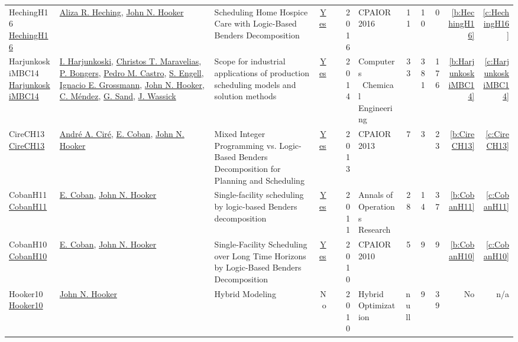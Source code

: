 {\begin{longtable}{>{\raggedright\arraybackslash}p{3cm}>{\raggedright\arraybackslash}p{6cm}>{\raggedright\arraybackslash}p{6.5cm}rrrp{2.5cm}rrrrr}
HechingH16 \href{https://doi.org/10.1007/978-3-319-33954-2\_14}{HechingH16} & \hyperref[auth:a323]{Aliza R. Heching}, \hyperref[auth:a162]{John N. Hooker} & Scheduling Home Hospice Care with Logic-Based Benders Decomposition & \href{works/HechingH16.pdf}{Yes} & \cite{HechingH16} & 2016 & CPAIOR 2016 & 11 & 10 & 0 & \ref{b:HechingH16} & \ref{c:HechingH16}\\
HarjunkoskiMBC14 \href{http://dx.doi.org/10.1016/j.compchemeng.2013.12.001}{HarjunkoskiMBC14} & \hyperref[auth:a884]{I. Harjunkoski}, \hyperref[auth:a387]{Christos T. Maravelias}, \hyperref[auth:a959]{P. Bongers}, \hyperref[auth:a907]{Pedro M. Castro}, \hyperref[auth:a70]{S. Engell}, \hyperref[auth:a388]{Ignacio E. Grossmann}, \hyperref[auth:a162]{John N. Hooker}, \hyperref[auth:a960]{C. Méndez}, \hyperref[auth:a961]{G. Sand}, \hyperref[auth:a962]{J. Wassick} & Scope for industrial applications of production scheduling models and solution methods & \href{works/HarjunkoskiMBC14.pdf}{Yes} & \cite{HarjunkoskiMBC14} & 2014 & Computers \  Chemical Engineering & 33 & 381 & 176 & \ref{b:HarjunkoskiMBC14} & \ref{c:HarjunkoskiMBC14}\\
CireCH13 \href{https://doi.org/10.1007/978-3-642-38171-3\_22}{CireCH13} & \hyperref[auth:a159]{Andr{\'{e}} A. Cir{\'{e}}}, \hyperref[auth:a341]{E. Coban}, \hyperref[auth:a162]{John N. Hooker} & Mixed Integer Programming vs. Logic-Based Benders Decomposition for Planning and Scheduling & \href{works/CireCH13.pdf}{Yes} & \cite{CireCH13} & 2013 & CPAIOR 2013 & 7 & 3 & 23 & \ref{b:CireCH13} & \ref{c:CireCH13}\\
CobanH11 \href{http://dx.doi.org/10.1007/s10479-011-1031-z}{CobanH11} & \hyperref[auth:a341]{E. Coban}, \hyperref[auth:a162]{John N. Hooker} & Single-facility scheduling by logic-based Benders decomposition & \href{works/CobanH11.pdf}{Yes} & \cite{CobanH11} & 2011 & Annals of Operations Research & 28 & 14 & 37 & \ref{b:CobanH11} & \ref{c:CobanH11}\\
CobanH10 \href{https://doi.org/10.1007/978-3-642-13520-0\_11}{CobanH10} & \hyperref[auth:a341]{E. Coban}, \hyperref[auth:a162]{John N. Hooker} & Single-Facility Scheduling over Long Time Horizons by Logic-Based Benders Decomposition & \href{works/CobanH10.pdf}{Yes} & \cite{CobanH10} & 2010 & CPAIOR 2010 & 5 & 9 & 9 & \ref{b:CobanH10} & \ref{c:CobanH10}\\
Hooker10 \href{http://dx.doi.org/10.1007/978-1-4419-1644-0_2}{Hooker10} & \hyperref[auth:a162]{John N. Hooker} & Hybrid Modeling & No & \cite{Hooker10} & 2010 & Hybrid Optimization & null & 9 & 39 & No & n/a\\

\end{longtable}}
